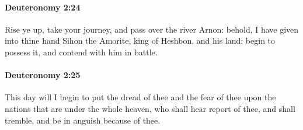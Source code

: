 		\paragraph{Deuteronomy 2:24} %
			\label{DEUTERONOMY-2-24}

			Rise ye up, take your journey, and pass over the river Arnon: behold, I have given into thine hand Sihon the Amorite, king of Heshbon, and his land: begin to possess it, and contend with him in battle.


		\paragraph{Deuteronomy 2:25} %
			\label{DEUTERONOMY-2-25}

			This day will I begin to put the dread of thee and the fear of thee upon the nations that are under the whole heaven, who shall hear report of thee, and shall tremble, and be in anguish because of thee.

